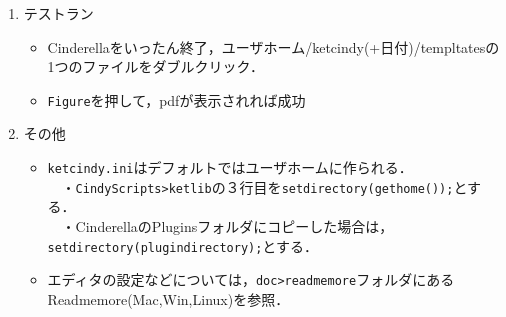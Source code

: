 \documentclass{ujarticle}
\begin{document}
\begin{enumerate}[\bf\large 1.]
\vspace{71mm}

\item テストラン\vspace{-2mm}

\begin{itemize}
 \item Cinderellaをいったん終了，ユーザホーム/ketcindy(+日付)/templtatesの1つのファイルをダブルクリック．
\item\verb|Figure|を押して，pdfが表示されれば成功
\end{itemize}

\item  その他\vspace{-2mm}
\begin{itemize}
\item \verb|ketcindy.ini|はデフォルトではユーザホームに作られる．\\
　・\verb|CindyScripts>ketlib|の３行目を\verb|setdirectory(gethome());|とする．\\
　・CinderellaのPluginsフォルダにコピーした場合は，\verb|setdirectory(plugindirectory);|とする．

\item エディタの設定などについては，\verb|doc>readmemore|フォルダにあるReadmemore(Mac,Win,Linux)を参照．
\end{itemize}
\end{enumerate}
\end{document}
